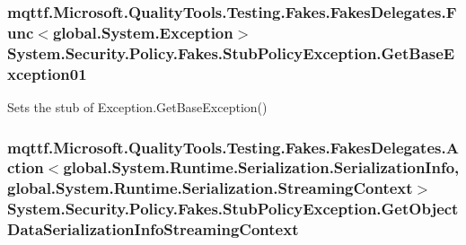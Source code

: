\hypertarget{class_system_1_1_security_1_1_policy_1_1_fakes_1_1_stub_policy_exception_a1373603006d68e583f64c115782d1df0}{
\subsubsection[{Get\-Base\-Exception01}]{\setlength{\rightskip}{0pt plus 5cm}mqttf.\-Microsoft.\-Quality\-Tools.\-Testing.\-Fakes.\-Fakes\-Delegates.\-Func$<$global.\-System.\-Exception$>$ System.\-Security.\-Policy.\-Fakes.\-Stub\-Policy\-Exception.\-Get\-Base\-Exception01}}\label{class_system_1_1_security_1_1_policy_1_1_fakes_1_1_stub_policy_exception_a1373603006d68e583f64c115782d1df0}


Sets the stub of Exception.\-Get\-Base\-Exception()

\hypertarget{class_system_1_1_security_1_1_policy_1_1_fakes_1_1_stub_policy_exception_ac8d19d050733065ddadfec881477886a}{
\subsubsection[{Get\-Object\-Data\-Serialization\-Info\-Streaming\-Context}]{\setlength{\rightskip}{0pt plus 5cm}mqttf.\-Microsoft.\-Quality\-Tools.\-Testing.\-Fakes.\-Fakes\-Delegates.\-Action$<$global.\-System.\-Runtime.\-Serialization.\-Serialization\-Info, global.\-System.\-Runtime.\-Serialization.\-Streaming\-Context$>$ System.\-Security.\-Policy.\-Fakes.\-Stub\-Policy\-Exception.\-Get\-Object\-Data\-Serialization\-Info\-Streaming\-Context}}\label{class_system_1_1_security_1_1_policy_1_1_fakes_1_1_stub_policy_exception_ac8d19d050733065ddadfec881477886a}



